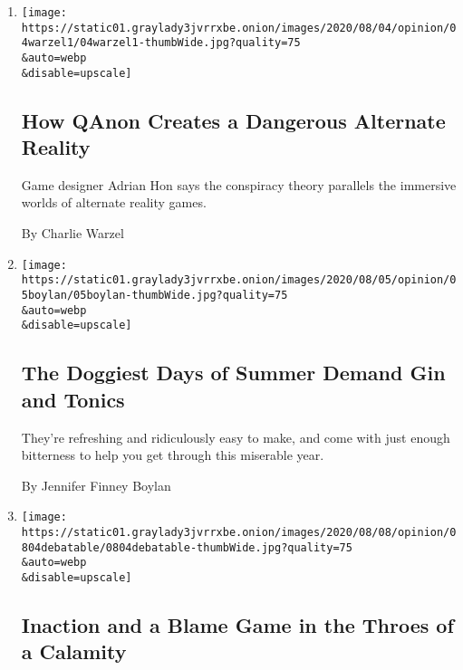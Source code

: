 \begin{enumerate}
\def\labelenumi{\arabic{enumi}.}
\item
  \href{/2020/08/04/opinion/qanon-conspiracy-theory-arg.html}{}

  \texttt{[image: https://static01.graylady3jvrrxbe.onion/images/2020/08/04/opinion/04warzel1/04warzel1-thumbWide.jpg?quality=75\\\&auto=webp\\\&disable=upscale]}

  \hypertarget{how-qanon-creates-a-dangerous-alternate-reality}{%
  \subsection{How QAnon Creates a Dangerous Alternate
  Reality}\label{how-qanon-creates-a-dangerous-alternate-reality}}

  Game designer Adrian Hon says the conspiracy theory parallels the
  immersive worlds of alternate reality games.

  By Charlie Warzel
\item
  \href{/2020/08/04/opinion/gin-tonic-summer-drink.html}{}

  \texttt{[image: https://static01.graylady3jvrrxbe.onion/images/2020/08/05/opinion/05boylan/05boylan-thumbWide.jpg?quality=75\\\&auto=webp\\\&disable=upscale]}

  \hypertarget{the-doggiest-days-of-summer-demand-gin-and-tonics}{%
  \subsection{The Doggiest Days of Summer Demand Gin and
  Tonics}\label{the-doggiest-days-of-summer-demand-gin-and-tonics}}

  They're refreshing and ridiculously easy to make, and come with just
  enough bitterness to help you get through this miserable year.

  By Jennifer Finney Boylan
\item
  \href{/2020/08/04/opinion/coronavirus-federal-relief-inaction-debatable.html}{}

  \texttt{[image: https://static01.graylady3jvrrxbe.onion/images/2020/08/08/opinion/0804debatable/0804debatable-thumbWide.jpg?quality=75\\\&auto=webp\\\&disable=upscale]}

  \hypertarget{inaction-and-a-blame-game-in-the-throes-of-a-calamity}{%
  \subsection{Inaction and a Blame Game in the Throes of a
  Calamity}\label{inaction-and-a-blame-game-in-the-throes-of-a-calamity}}


\end{enumerate}
